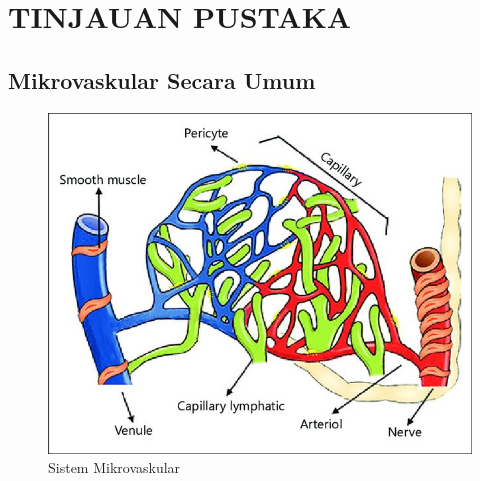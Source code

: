 \chapter{TINJAUAN PUSTAKA}



\section{Mikrovaskular Secara Umum}

\begin{figure}[H]
	\centering
	\includegraphics[scale=0.9]{gambar/mikrovaskular.jpg}
	\caption{ Sistem Mikrovaskular \cite{guven_microcirculation_2020}}
	\label{fig:mikrovaskular}
\end{figure}


